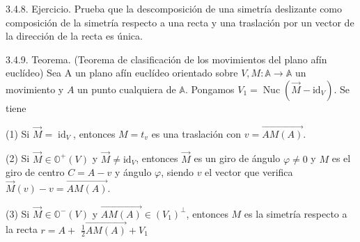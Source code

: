 \documentclass[12pt, a4paper, ones, notitlepage, openany,titlepage]{article}
\begin{document}
3.4.8. Ejercicio. Prueba que la descomposición de una simetría deslizante como composición de la simetría respecto a una recta y una traslación por un vector de la dirección de la recta es única.

3.4.9. Teorema. (Teorema de clasificación de los movimientos del plano afín euclídeo) Sea A un plano afín euclídeo orientado sobre $V, M: \mathbb{A} \rightarrow \mathbb{A}$ un movimiento y $A$ un punto cualquiera de $\mathbb{A}$. Pongamos $V_{1}=\operatorname{Nuc}\left(\vec{M}-\mathrm{id}_{V}\right)$. Se tiene

(1) Si $\vec{M}=\operatorname{id}_{V}$, entonces $M=t_{v}$ es una traslación con $v=\overrightarrow{A M(A)}$.

(2) Si $\vec{M} \in \mathbb{O}^{+}(V)$ y $\vec{M} \neq \mathrm{id}_{V}$, entonces $\vec{M}$ es un giro de ángulo $\varphi \neq 0$ y $M$ es el giro de centro $C=A-v$ y ángulo $\varphi$, siendo $v$ el vector que verifica $\vec{M}(v)-v=\overrightarrow{A M(A)}$.

(3) Si $\vec{M} \in \mathbb{O}^{-}(V)$ y $\overrightarrow{A M(A)} \in\left(V_{1}\right)^{\perp}$, entonces $M$ es la simetría respecto a la recta $r=A+$ $\frac{1}{2} \overrightarrow{A M(A)}+V_{1}$
\end{document}
